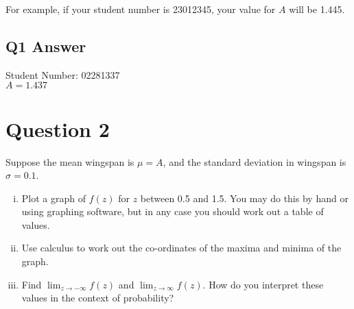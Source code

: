 \documentclass[12pt]{article}
\begin{document}
For example, if your student number is 23012345, your value for $A$ will be 1.445.

\subsection*{Q1 Answer}
Student Number: 02281337 \\
$A = 1.437$


\section*{Question 2}
Suppose the mean wingspan is $\mu=A$, and the standard deviation in wingspan is $\sigma=0.1$.
\begin{enumerate}[i.]
    \item Plot a graph of $f(z)$ for $z$ between 0.5 and 1.5. You may do this by hand or using graphing software, but in any case you should work out a table of values.
    \item Use calculus to work out the co-ordinates of the maxima and minima of the graph.
    \item Find $\lim _{z \rightarrow-\infty} f(z)$ and $\lim _{z \rightarrow \infty} f(z)$. How do you interpret these values in the context of probability?
\end{enumerate}
\end{document}
